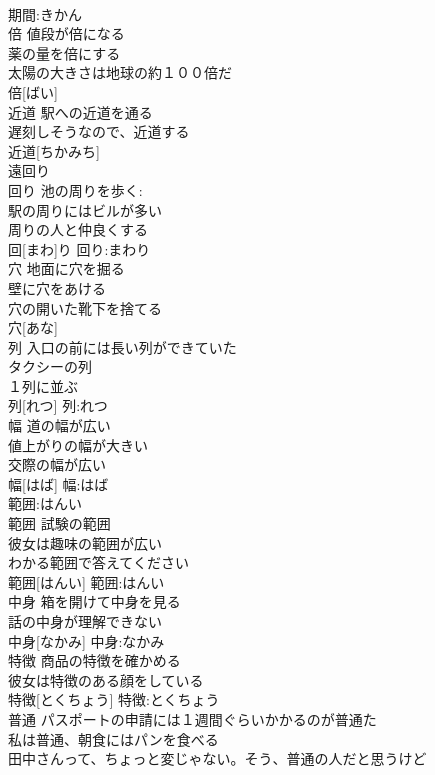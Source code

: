 \documentclass[8pt]{extreport}
\begin{document}
\begin{CJK}{UTF8}{min}
\\	期間:きかん
\\	倍	値段が倍になる 
\\	薬の量を倍にする 
\\	太陽の大きさは地球の約１００倍だ 
\\	倍[ばい]						
\\	近道	駅への近道を通る 
\\	遅刻しそうなので、近道する 
\\	近道[ちかみち]			
\\	遠回り 
\\	回り	池の周りを歩く: 
\\	駅の周りにはビルが多い 
\\	周りの人と仲良くする 
\\	回[まわ]り			回り:まわり
\\	穴	地面に穴を掘る 
\\	壁に穴をあける 
\\	穴の開いた靴下を捨てる 
\\	穴[あな]						
\\	列	入口の前には長い列ができていた 
\\	タクシーの列 
\\	１列に並ぶ 
\\	列[れつ]			列:れつ
\\	幅	道の幅が広い 
\\	値上がりの幅が大きい 
\\	交際の幅が広い 
\\	幅[はば]			幅:はば
\\	範囲:はんい
\\	範囲	試験の範囲 
\\	彼女は趣味の範囲が広い 
\\	わかる範囲で答えてください 
\\	範囲[はんい]			範囲:はんい
\\	中身	箱を開けて中身を見る 
\\	話の中身が理解できない 
\\	中身[なかみ]			中身:なかみ
\\	特徴	商品の特徴を確かめる 
\\	彼女は特徴のある顔をしている 
\\	特徴[とくちょう]			特徴:とくちょう
\\	普通	パスポートの申請には１週間ぐらいかかるのが普通た 
\\	私は普通、朝食にはパンを食べる 
\\	田中さんって、ちょっと変じゃない。そう、普通の人だと思うけど 

\end{CJK}
\end{document}
